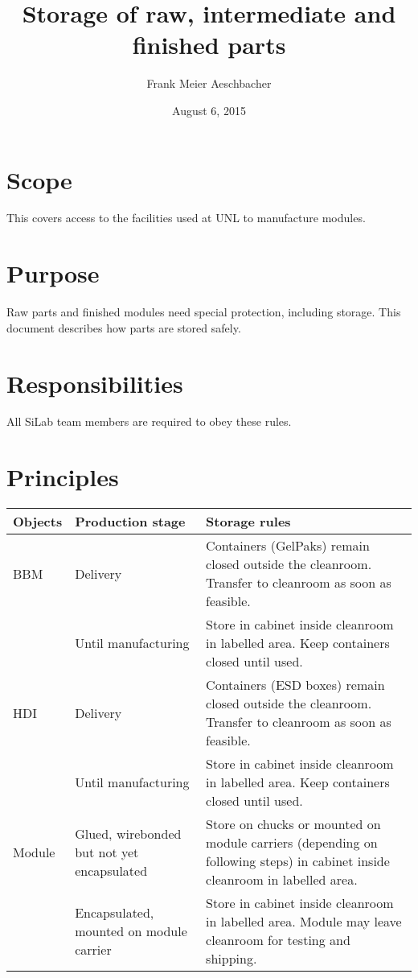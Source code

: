 \documentclass[12pt]{unlsilabsop}
\title{Storage of raw, intermediate and finished parts}
\date{August 6, 2015}
\author{Frank Meier Aeschbacher}
\begin{document}
\maketitle

\section{Scope}
This covers access to the facilities used at UNL to manufacture modules.

\section{Purpose}
Raw parts and finished modules need special protection, including storage. This document describes how parts are stored safely.


\section{Responsibilities}
All SiLab team members are required to obey these rules.

\section{Principles}

\begin{tabular}{p{2.5cm}p{4.5cm}p{8cm}}
    \toprule
Objects & Production stage & Storage rules \\
    \midrule
BBM & Delivery & Containers (GelPaks) remain closed outside the cleanroom. Transfer to cleanroom as soon as feasible. \\
    & Until manufacturing & Store in cabinet inside cleanroom in labelled area. Keep containers closed until used. \\
    \midrule
HDI & Delivery & Containers (ESD boxes) remain closed outside the cleanroom. Transfer to cleanroom as soon as feasible. \\
    & Until manufacturing & Store in cabinet inside cleanroom in labelled area. Keep containers closed until used. \\
    \midrule
Module & Glued, wirebonded but not yet encapsulated & Store on chucks or mounted on module carriers (depending on following steps) in cabinet inside cleanroom in labelled area. \\
       & Encapsulated, mounted on module carrier & Store in cabinet inside cleanroom in labelled area. Module may leave cleanroom for testing and shipping. \\
    \bottomrule
\end{tabular}
\end{document}
